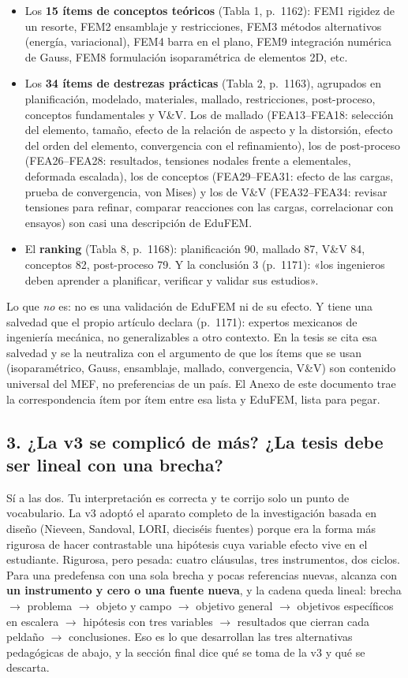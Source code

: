 \documentclass[11pt,a4paper]{article}
\begin{document}
\begin{itemize}
\item Los \textbf{15 ítems de conceptos teóricos} (Tabla 1, p.~1162): FEM1 rigidez de un resorte, FEM2 ensamblaje y restricciones, FEM3 métodos alternativos (energía, variacional), FEM4 barra en el plano, FEM9 integración numérica de Gauss, FEM8 formulación isoparamétrica de elementos 2D, etc.
\item Los \textbf{34 ítems de destrezas prácticas} (Tabla 2, p.~1163), agrupados en planificación, modelado, materiales, mallado, restricciones, post-proceso, conceptos fundamentales y V\&V. Los de mallado (FEA13--FEA18: selección del elemento, tamaño, efecto de la relación de aspecto y la distorsión, efecto del orden del elemento, convergencia con el refinamiento), los de post-proceso (FEA26--FEA28: resultados, tensiones nodales frente a elementales, deformada escalada), los de conceptos (FEA29--FEA31: efecto de las cargas, prueba de convergencia, von Mises) y los de V\&V (FEA32--FEA34: revisar tensiones para refinar, comparar reacciones con las cargas, correlacionar con ensayos) son casi una descripción de EduFEM.
\item El \textbf{ranking} (Tabla 8, p.~1168): planificación 90, mallado 87, V\&V 84, conceptos 82, post-proceso 79. Y la conclusión 3 (p.~1171): «los ingenieros deben aprender a planificar, verificar y validar sus estudios».
\end{itemize}

Lo que \emph{no} es: no es una validación de EduFEM ni de su efecto. Y tiene una salvedad que el propio artículo declara (p.~1171): expertos mexicanos de ingeniería mecánica, no generalizables a otro contexto. En la tesis se cita esa salvedad y se la neutraliza con el argumento de que los ítems que se usan (isoparamétrico, Gauss, ensamblaje, mallado, convergencia, V\&V) son contenido universal del MEF, no preferencias de un país. El Anexo de este documento trae la correspondencia ítem por ítem entre esa lista y EduFEM, lista para pegar.

\subsection*{3. ¿La v3 se complicó de más? ¿La tesis debe ser lineal con una brecha?}

Sí a las dos. Tu interpretación es correcta y te corrijo solo un punto de vocabulario. La v3 adoptó el aparato completo de la investigación basada en diseño (Nieveen, Sandoval, LORI, dieciséis fuentes) porque era la forma más rigurosa de hacer contrastable una hipótesis cuya variable efecto vive en el estudiante. Rigurosa, pero pesada: cuatro cláusulas, tres instrumentos, dos ciclos. Para una predefensa con una sola brecha y pocas referencias nuevas, alcanza con \textbf{un instrumento y cero o una fuente nueva}, y la cadena queda lineal: brecha $\to$ problema $\to$ objeto y campo $\to$ objetivo general $\to$ objetivos específicos en escalera $\to$ hipótesis con tres variables $\to$ resultados que cierran cada peldaño $\to$ conclusiones. Eso es lo que desarrollan las tres alternativas pedagógicas de abajo, y la sección final dice qué se toma de la v3 y qué se descarta.
\end{document}
